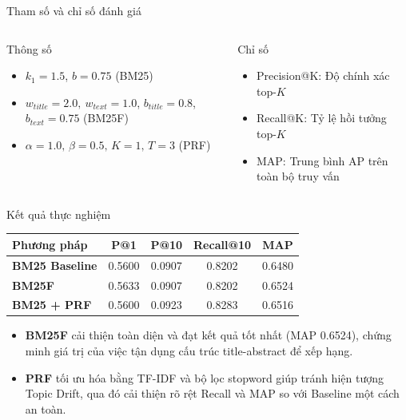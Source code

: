 \documentclass[10pt,aspectratio=169]{beamer}
\begin{document}
\begin{frame}{Tham số và chỉ số đánh giá}
\begin{columns}[T,onlytextwidth]
\begin{block}{Thông số}
\begin{itemize}
    \item $k_1=1.5$, $b=0.75$ (BM25)
    \item $w_{title}=2.0,\  w_{text}=1.0$, $b_{title}=0.8$, $b_{text}=0.75$ (BM25F)
    \item $\alpha=1.0,\, \beta=0.5,\, K=1, \, T=3$ (PRF)
\end{itemize}
\end{block}

\begin{block}{Chỉ số}
\begin{itemize}
    \item Precision@K: Độ chính xác top-$K$
    \item Recall@K: Tỷ lệ hồi tưởng top-$K$
    \item MAP: Trung bình AP trên toàn bộ truy vấn
\end{itemize}
\end{block}
\end{columns}
\end{frame}

\begin{frame}{Kết quả thực nghiệm}
\begin{table}
\centering
\renewcommand{\arraystretch}{1.5}
\setlength{\tabcolsep}{15pt}
\large
{}
\begin{tabular}{>{\bfseries}l c c c c}
\toprule
Phương pháp & P@1 & P@10 & Recall@10 & MAP \\
\midrule
BM25 Baseline & 0.5600 & 0.0907 & 0.8202 & 0.6480 \\
BM25F & 0.5633 & 0.0907 & 0.8202 & 0.6524 \\
BM25 + PRF & 0.5600 & 0.0923 & 0.8283 & 0.6516 \\
\bottomrule
\end{tabular}
\end{table}

\vspace{.6em}
\begin{itemize}
    \item \textbf{BM25F} cải thiện toàn diện và đạt kết quả tốt nhất (MAP 0.6524), chứng minh giá trị của việc tận dụng cấu trúc title-abstract để xếp hạng.
    \item \textbf{PRF} tối ưu hóa bằng TF-IDF và bộ lọc stopword giúp tránh hiện tượng Topic Drift, qua đó cải thiện rõ rệt Recall và MAP so với Baseline một cách an toàn.
\end{itemize}
\end{frame}
\end{document}
